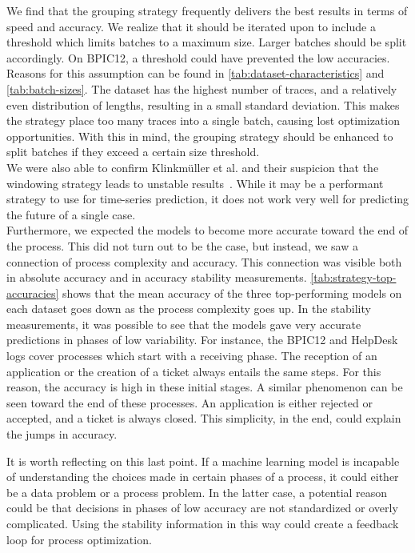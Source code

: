 We find that the grouping strategy frequently delivers the best results in terms of speed and accuracy.
We realize that it should be iterated upon to include a threshold which limits batches to a maximum size.
Larger batches should be split accordingly.
On BPIC12, a threshold could have prevented the low accuracies.
Reasons for this assumption can be found in \autoref{tab:dataset-characteristics} and \autoref{tab:batch-sizes}.
The dataset has the highest number of traces, and a relatively even distribution of lengths, resulting in a small standard deviation.
This makes the strategy place too many traces into a single batch, causing lost optimization opportunities.
With this in mind, the grouping strategy should be enhanced to split batches if they exceed a certain size threshold.\\

We were also able to confirm Klinkmüller et al. and their suspicion that the windowing strategy leads to unstable results~\cite{klinkmuller2018reliablemonitoring}.
While it may be a performant strategy to use for time-series prediction, it does not work very well for predicting the future of a single case.\\

Furthermore, we expected the models to become more accurate toward the end of the process.
This did not turn out to be the case, but instead, we saw a connection of process complexity and accuracy.
This connection was visible both in absolute accuracy and in accuracy stability measurements.
\autoref{tab:strategy-top-accuracies} shows that the mean accuracy of the three top-performing models on each dataset goes down as the process complexity goes up.
In the stability measurements, it was possible to see that the models gave very accurate predictions in phases of low variability.
For instance, the BPIC12 and HelpDesk logs cover processes which start with a receiving phase.
The reception of an application or the creation of a ticket always entails the same steps.
For this reason, the accuracy is high in these initial stages.
A similar phenomenon can be seen toward the end of these processes.
An application is either rejected or accepted, and a ticket is always closed.
This simplicity, in the end, could explain the jumps in accuracy.

It is worth reflecting on this last point.
If a machine learning model is incapable of understanding the choices made in certain phases of a process, it could either be a data problem or a process problem.
In the latter case, a potential reason could be that decisions in phases of low accuracy are not standardized or overly complicated.
Using the stability information in this way could create a feedback loop for process optimization.\\

